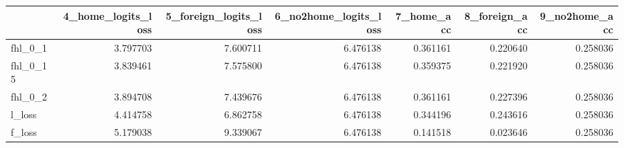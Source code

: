 \begin{tabular}{lrrrrrr}
\toprule
 & 4_home_logits_loss & 5_foreign_logits_loss & 6_no2home_logits_loss & 7_home_acc & 8_foreign_acc & 9_no2home_acc \\
\midrule
fhl_0_1 & 3.797703 & 7.600711 & 6.476138 & 0.361161 & 0.220640 & 0.258036 \\
fhl_0_15 & 3.839461 & 7.575800 & 6.476138 & 0.359375 & 0.221920 & 0.258036 \\
fhl_0_2 & 3.894708 & 7.439676 & 6.476138 & 0.361161 & 0.227396 & 0.258036 \\
l_loss & 4.414758 & 6.862758 & 6.476138 & 0.344196 & 0.243616 & 0.258036 \\
f_loss & 5.179038 & 9.339067 & 6.476138 & 0.141518 & 0.023646 & 0.258036 \\
\bottomrule
\end{tabular}
